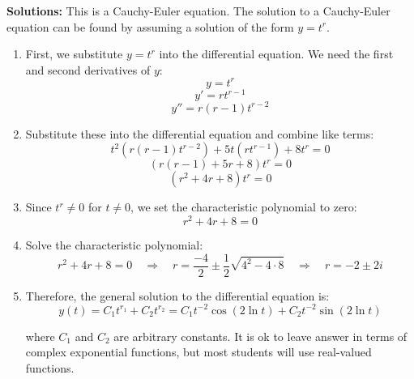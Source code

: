 \ifnum {} {\color{DarkBlue} 
\textbf{Solutions:}
This is a Cauchy-Euler equation. The solution to a Cauchy-Euler equation can be found by assuming a solution of the form \( y = t^r \). 

\begin{enumerate}
    \item First, we substitute \( y = t^r \) into the differential equation. We need the first and second derivatives of \( y \):
   \[ y = t^r \]
   \[ y' = r t^{r-1} \]
   \[ y'' = r (r-1) t^{r-2} \]

    \item Substitute these into the differential equation and combine like terms:
   \[ t^2 (r (r-1) t^{r-2}) + 5t (r t^{r-1}) + 8 t^r = 0 \]
   \[ (r (r-1) + 5r + 8) t^r = 0 \]
   \[ (r^2 + 4r + 8) t^r = 0 \]

    \item Since \( t^r \neq 0 \) for \( t \neq 0 \), we set the characteristic polynomial to zero:
   \[ r^2 + 4r + 8 = 0 \]

    \item Solve the characteristic polynomial:
    \[ r^2 + 4r + 8 = 0 \quad \Rightarrow \quad 
    r = \frac{-4}{2} \pm \frac12 \sqrt{4^2 - 4 \cdot 8} \quad \Rightarrow \quad 
    r = -2 \pm 2i
    \]
    
    \item Therefore, the general solution to the differential equation is:
   \[ y(t) = C_1 t^{r_1} + C_2 t^{r_2} = C_1t^{-2}\cos(2\ln t) + C_2 t^{-2}\sin(2 \ln t) \]

where \( C_1 \) and \( C_2 \) are arbitrary constants. It is ok to leave answer in terms of complex exponential functions, but most students will use real-valued functions. 
\end{enumerate}


} 
\else 
\newpage
\fi
\fi 